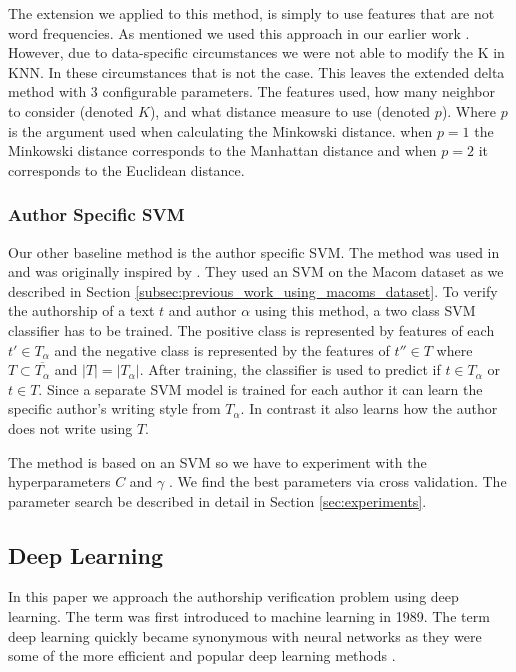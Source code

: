The extension we applied to this method, is simply to use features that are
not word frequencies. As mentioned we used this approach in our earlier work
\citep{US}. However, due to data-specific circumstances we were not able to
modify the K in \gls{KNN}. In these circumstances that is not the case. This
leaves the extended delta method with 3 configurable parameters. The features
used, how many neighbor to consider (denoted $K$), and what distance measure to
use (denoted $p$). Where $p$ is the argument used when calculating the Minkowski
distance. when $p = 1$ the Minkowski distance corresponds to the Manhattan
distance and when $p=2$ it corresponds to the Euclidean distance.

\subsubsection{Author Specific SVM}

Our other baseline method is the author specific \gls{SVM}. The method
was used in \citep{US} and was originally inspired by \citet{hansen2014}.
They used an \gls{SVM} on the Macom dataset as we described in Section
\ref{subsec:previous_work_using_macoms_dataset}. To verify the authorship of a
text $t$ and author $\alpha$ using this method, a two class \gls{SVM} classifier
has to be trained. The positive class is represented by features of each $t' \in
T_\alpha$ and the negative class is represented by the features of $t'' \in T$
where $T \subset \overline{T_\alpha}$ and $|T| = |T_\alpha|$. After training,
the classifier is used to predict if $t \in T_\alpha$ or $t \in T$.
Since a separate \gls{SVM} model is trained for each author it can learn
the specific author's writing style from $T_\alpha$. In contrast it also learns
how the author does not write using $T$.

The method is based on an \gls{SVM} so we have to experiment
with the hyperparameters $C$ and $\gamma$ \citep[E-Chapter
8]{Abu-Mostafa:2012:LD:2207825}. We find the best parameters via cross
validation. The parameter search be described in detail in Section
\ref{sec:experiments}.


\subsection{Deep Learning}

In this paper we approach the authorship verification problem using deep
learning. The term was first introduced to machine learning in 1989. The
term deep learning quickly became synonymous with neural networks as
they were some of the more efficient and popular deep learning methods
\citep{Schmidhuber:2015}.

